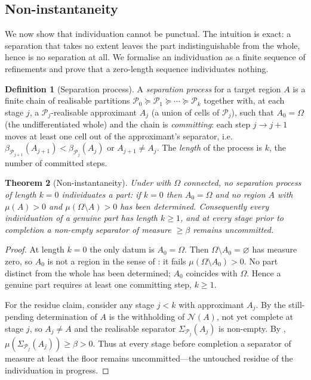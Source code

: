 \documentclass[11pt,a4paper]{article}
\theoremstyle{thmstyle}
\newtheorem{theorem}{Theorem}[section]
\theoremstyle{definition}
\newtheorem{definition}[theorem]{Definition}
\theoremstyle{remark}
\newcommand{\Space}{\Omega}
\newcommand{\thick}{\beta}
\newcommand{\Part}{\mathscr{P}}
\newcommand{\Neg}{\mathcal{N}}
\begin{document}
\subsection{Non-instantaneity}

We now show that individuation cannot be punctual. The intuition is exact: a
separation that takes no extent leaves the part indistinguishable from the
whole, hence is no separation at all. We formalise an individuation as a finite
sequence of refinements and prove that a zero-length sequence individuates
nothing.

\begin{definition}[Separation process]
\label{def:process}
A \emph{separation process} for a target region $A$ is a finite chain of
realisable partitions
$\Part_0\succeq\Part_1\succeq\cdots\succeq\Part_k$
together with, at each stage $j$, a $\Part_j$-realisable approximant $A_j$
(a union of cells of $\Part_j$), such that $A_0=\Space$ \textup{(}the
undifferentiated whole\textup{)} and the chain is \emph{committing}: each step
$j\to j+1$ moves at least one cell out of the approximant's separator, i.e.\
$\thick_{\Part_{j+1}}(A_{j+1})<\thick_{\Part_j}(A_j)$ or
$A_{j+1}\neq A_j$. The \emph{length} of the process is $k$, the number of
committed steps.
\end{definition}

\begin{theorem}[Non-instantaneity]
\label{thm:noninstant}
Under  with $\Space$ connected, no separation process of length
$k=0$ individuates a part: if $k=0$ then $A_0=\Space$ and no region $A$ with
$\mu(A)>0$ and $\mu(\Space\setminus A)>0$ has been determined. Consequently every
individuation of a genuine part has length $k\ge1$, and at every stage prior to
completion a non-empty separator of measure $\ge\thick$ remains uncommitted.
\end{theorem}

\begin{proof}
At length $k=0$ the only datum is $A_0=\Space$. Then $\Space\setminus A_0=\varnothing$
has measure zero, so $A_0$ is not a region in the sense of \Cref{def:region}: it
fails $\mu(\Space\setminus A_0)>0$. No part distinct from the whole has been
determined; $A_0$ coincides with $\Space$. Hence a genuine part requires at least
one committing step, $k\ge1$.

For the residue claim, consider any stage $j<k$ with approximant $A_j$. By
\Cref{thm:negation-unique} the still-pending determination of $A$ is the
withholding of $\Neg(A)$, not yet complete at stage $j$, so $A_j\neq A$ and the
realisable separator $\Sigma_{\Part_j}(A_j)$ is non-empty. By
, $\mu(\Sigma_{\Part_j}(A_j))\ge\thick>0$. Thus at every
stage before completion a separator of measure at least the floor remains
uncommitted---the untouched residue of the individuation in progress.
\end{proof}
\end{document}
